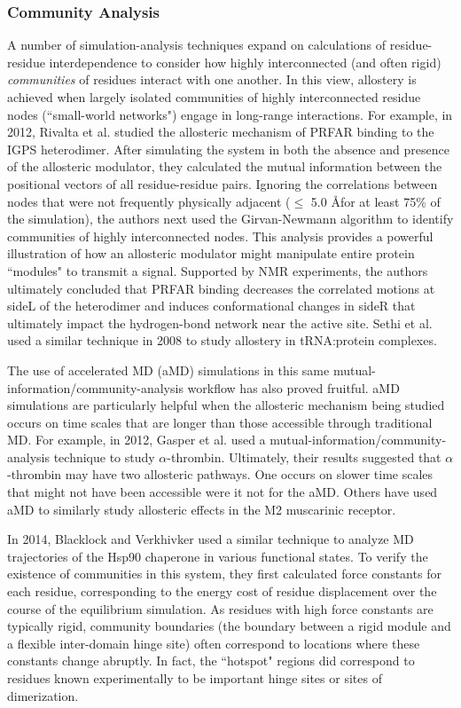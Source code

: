 \subsubsection{Community Analysis}
\par A number of simulation-analysis techniques expand on calculations of residue-residue interdependence to consider how highly interconnected (and often rigid) \textit{communities} of residues interact with one another. In this view, allostery is achieved when largely isolated communities of highly interconnected residue nodes (``small-world networks") engage in long-range interactions. For example, in 2012, Rivalta et al. studied the allosteric mechanism of PRFAR binding to the IGPS heterodimer.\cite{Rivalta2012} After simulating the system in both the absence and presence of the allosteric modulator, they calculated the mutual information between the positional vectors of all residue-residue pairs. Ignoring the correlations between nodes that were not frequently physically adjacent ($\leq$ 5.0 \AA for at least 75\% of the simulation), the authors next used the Girvan-Newmann algorithm to identify communities of highly interconnected nodes. This analysis provides a powerful illustration of how an allosteric modulator might manipulate entire protein ``modules" to transmit a signal. Supported by NMR experiments, the authors ultimately concluded that PRFAR binding decreases the correlated motions at sideL of the heterodimer and induces conformational changes in sideR that ultimately impact the hydrogen-bond network near the active site.\cite{Rivalta2012} Sethi et al. used a similar technique in 2008 to study allostery in tRNA:protein complexes.\cite{Sethi2009}
\par The use of accelerated MD (aMD) simulations in this same mutual-information/community-analysis workflow has also proved fruitful. aMD simulations are particularly helpful when the allosteric mechanism being studied occurs on time scales that are longer than those accessible through traditional MD. For example, in 2012, Gasper et al. used a mutual-information/community-analysis technique to study $\alpha$-thrombin.\cite{Gasper2012a} Ultimately, their results suggested that $\alpha$-thrombin may have two allosteric pathways. One occurs on slower time scales that might not have been accessible were it not for the aMD. Others have used aMD to similarly study allosteric effects in the M2 muscarinic receptor.\cite{Miao2013a}
\par In 2014, Blacklock and Verkhivker used a similar technique to analyze MD trajectories of the Hsp90 chaperone in various functional states.\cite{Blacklock2014a} To verify the existence of communities in this system, they first calculated force constants for each residue, corresponding to the energy cost of residue displacement over the course of the equilibrium simulation. As residues with high force constants are typically rigid, community boundaries (\eg the boundary between a rigid module and a flexible inter-domain hinge site) often correspond to locations where these constants change abruptly. In fact, the ``hotspot" regions did correspond to residues known experimentally to be important hinge sites or sites of dimerization.
